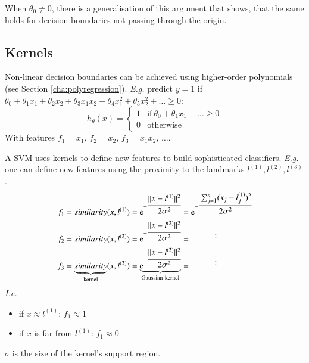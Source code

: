 \documentclass[a4paper,twoside,10pt]{article}
\begin{document}
When $\theta_0\ne 0$, there is a generalisation of this argument that shows, that the same holds for decision boundaries not passing through the origin.

\subsection{Kernels}
Non-linear decision boundaries can be achieved using higher-order polynomials (see Section \ref{cha:polyregression}).
\emph{E.g.} predict $y=1$ if
$\theta_0+\theta_1x_1+\theta_2x_2+\theta_3x_1x_2+\theta_4x_1^2+\theta_5x_2^2+\ldots\ge 0$:
\begin{equation*}
  h_\theta(x)=\left\{\begin{array}{rl}1&\mathrm{if\ }\theta_0+\theta_1 x_1+\ldots\ge 0\\0&\mathrm{otherwise}\end{array}\right.
\end{equation*}
With features $f_1=x_1$, $f_2=x_2$, $f_3=x_1 x_2$, $\ldots$.

A \ac{SVM} uses kernels to define new features to build sophisticated classifiers.
\emph{E.g.} one can define new features using the proximity to the landmarks $l^{(1)},l^{(2)},l^{(3)}$.
\begin{align*}
  \begin{split}
    f_1=similarity(x,l^{(1)})&=\operatorname{e}^{-\cfrac{||x-l^{(1)}||^2}{2\sigma^2}}=\operatorname{e}^{-\cfrac{\sum_{j=1}^n(x_j-l^{(1)}_j)^2}{2\sigma^2}}\\
    f_2=similarity(x,l^{(2)})&=\operatorname{e}^{-\cfrac{||x-l^{(2)}||^2}{2\sigma^2}}=\hspace{1cm}\vdots\\
    f_3=\underbrace{similarity}_{\mathrm{kernel}}(x,l^{(3)})&=\underbrace{\operatorname{e}^{-\cfrac{||x-l^{(3)}||^2}{2\sigma^2}}}_{\mathrm{Gaussian\ kernel}}=\hspace{1cm}\vdots
  \end{split}
\end{align*}
\emph{I.e.}
\begin{itemize}
  \item if $x\approx l^{(1)}$: $f_1\approx 1$
  \item if $x$ is far from $l^{(1)}$: $f_1\approx 0$
\end{itemize}
$\sigma$ is the size of the kernel's support region.
\end{document}
